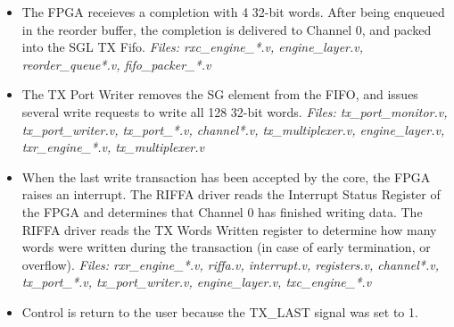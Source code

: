 \documentclass{refrep}
\begin{document}
\begin{itemize}
{     channel*.v, tx\_multiplexer.v, engine\_layer.v, txr\_engine\_*.v,
     interrupt.v}
 \item The FPGA receieves a completion with 4 32-bit words. After being enqueued
   in the reorder buffer, the completion is delivered to Channel 0, and packed
   into the SGL TX Fifo. \textit{Files: rxc\_engine\_*.v, engine\_layer.v,
     reorder\_queue*.v, fifo\_packer\_*.v}
 \item The TX Port Writer removes the SG element from the FIFO, and issues
   several write requests to write all 128 32-bit words. \textit{Files:
     tx\_port\_monitor.v, tx\_port\_writer.v, tx\_port\_*.v, channel*.v, tx\_multiplexer.v,
     engine\_layer.v, txr\_engine\_*.v, tx\_multiplexer.v}
 \item When the last write transaction has been accepted by the core, the FPGA
   raises an interrupt. The RIFFA driver reads the Interrupt Status Register of
   the FPGA and determines that Channel 0 has finished writing data. The RIFFA
   driver reads the TX Words Written register to determine how many words were
   written during the transaction (in case of early termination, or overflow).
   \textit{Files: rxr\_engine\_*.v, riffa.v, interrupt.v, registers.v, channel*.v,
     tx\_port\_*.v, tx\_port\_writer.v, engine\_layer.v, txc\_engine\_*.v}
 \item Control is return to the user because the TX\_LAST signal was set to 1.
\end{itemize}
\end{document}
